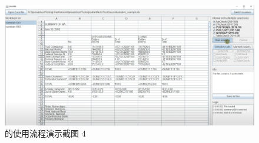\begin{figure}[tbp]    
    \centering
    \includegraphics[width=\textwidth]{figure/sg/sguard-4.png}
    \caption{\sg 的使用流程演示截图 4}
    \label{figure-sg4}
\end{figure}